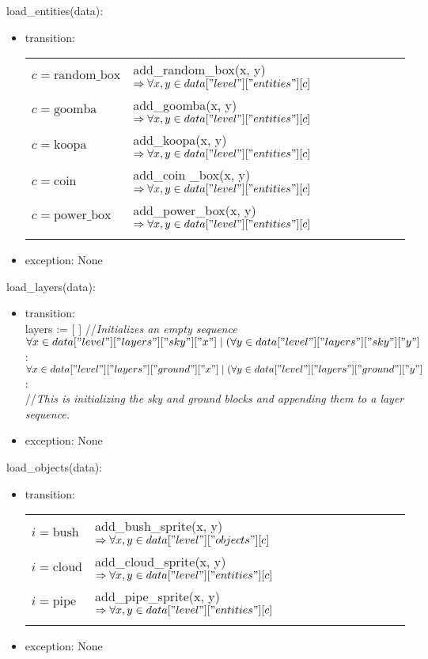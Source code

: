 \documentclass[12pt]{article}
\begin{document}
load\_entities(data):
\begin{itemize}
    \item transition: \\
\begin{tabular}{|p{3cm}|l|}
\hhline{|-|-|}
$c = \mbox{random\_box}$ & add\_random\_box(x, y) $\Rightarrow \forall x, y \in data["level"]["entities"][c]$\\
\hhline{|-|-|}
$c = \mbox{goomba}$ & add\_goomba(x, y) $\Rightarrow \forall x, y \in data["level"]["entities"][c]$\\
\hhline{|-|-|}
$c = \mbox{koopa}$ & add\_koopa(x, y) $\Rightarrow \forall x, y \in data["level"]["entities"][c]$\\
\hhline{|-|-|}
$c = \mbox{coin}$ & add\_coin \_box(x, y) $\Rightarrow \forall x, y \in data["level"]["entities"][c]$\\
\hhline{|-|-|}
\color{red}$c = \mbox{power\_box}$ & \color{red}add\_power\_box(x, y) $\Rightarrow \forall x, y \in data["level"]["entities"][c]$\\
\hhline{|-|-|}
\end{tabular}
    \item exception: None
\end{itemize}

load\_layers(data):
\begin{itemize}
    \item transition:\\
    layers := [ ]  //\emph{Initializes an empty sequence}\\
    $\forall x \in data["level"]["layers"]["sky"]["x"] \mid (\forall y \in data["level"]["layers"]["sky"]["y"]$ : \\
    $\forall x \in data["level"]["layers"]["ground"]["x"] \mid (\forall y \in data["level"]["layers"]["ground"]["y"]$ : \\
    //\emph{This is initializing the sky and ground blocks and appending them to a layer sequence.}
    \item exception: None
\end{itemize}

load\_objects(data):
\begin{itemize}
    \item transition: \\
    \begin{tabular}{|p{3cm}|l|}
\hhline{|-|-|}
$i = \mbox{bush}$ & add\_bush\_sprite(x, y) $\Rightarrow \forall x, y \in data["level"]["objects"][c]$\\
\hhline{|-|-|}
$i = \mbox{cloud}$ & add\_cloud\_sprite(x, y) $\Rightarrow \forall x, y \in data["level"]["entities"][c]$\\
\hhline{|-|-|}
$i = \mbox{pipe}$ & add\_pipe\_sprite(x, y) $\Rightarrow \forall x, y \in data["level"]["entities"][c]$\\
\hhline{|-|-|}
\end{tabular}
    \item exception: None
\end{itemize}
\end{document}
